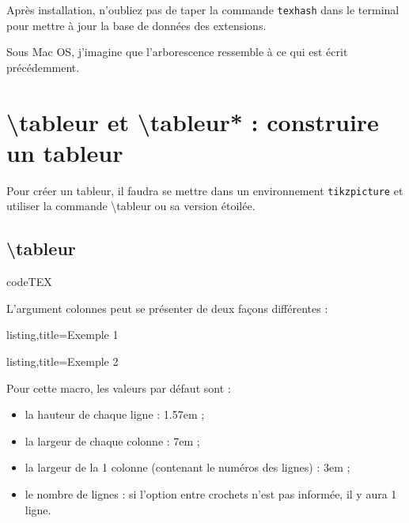 \documentclass[a4paper,french]{article}
\begin{document}
\medskip

Apr\`es installation, n'oubliez pas de taper la commande \texttt{texhash} dans le terminal pour mettre \`a jour la base de donn\'ees des extensions.

\bigskip 

Sous Mac OS, j'imagine que l'arborescence ressemble \`a ce qui est \'ecrit pr\'ec\'edemment.


\section{\textbackslash tableur et \textbackslash tableur* : construire un tableur}

Pour cr\'eer un tableur, il faudra se mettre dans un environnement \texttt{tikzpicture} et utiliser la commande \textbackslash tableur ou sa version \'etoil\'ee.

\subsection{\textbackslash tableur}

\begin{tcblisting}{codeTEX}
\end{tcblisting}

\bigskip

L'argument \og colonnes \fg{} peut se pr\'esenter de deux fa\c cons diff\'erentes :

\bigskip

\begin{tcblisting}{listing,title=Exemple 1}
\end{tcblisting}

\bigskip

\begin{tcblisting}{listing,title=Exemple 2}
\end{tcblisting}

\bigskip

Pour cette macro, les valeurs par d\'efaut sont :

\medskip

\begin{itemize}
\item la hauteur de chaque ligne : 1.57em ;
\item la largeur de chaque colonne : 7em ;
\item la largeur de la 1\iere{} colonne (contenant le num\'eros des lignes) : 3em ;
\item le nombre de lignes : si l'option entre crochets n'est pas inform\'ee, il y aura 1 ligne.
\end{itemize}
\end{document}
